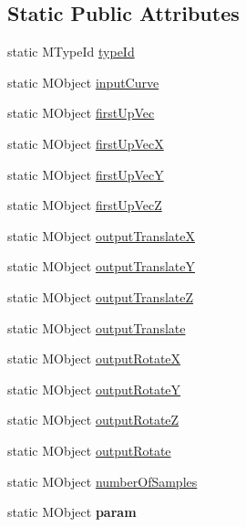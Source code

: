 \subsection*{Static Public Attributes}
\begin{DoxyCompactItemize}
\item 
static M\-Type\-Id \hyperlink{class_m_g__curve_point_abed748ebe3d1bf04847b9a2902faeff8}{type\-Id}
\item 
static M\-Object \hyperlink{class_m_g__curve_point_a466a5df04a399233b232242c869cd1ce}{input\-Curve}
\item 
static M\-Object \hyperlink{class_m_g__curve_point_a79320a0786213a2898e043f8f98cecd0}{first\-Up\-Vec}
\item 
static M\-Object \hyperlink{class_m_g__curve_point_ac612721b20d10233d1ba845ea983c679}{first\-Up\-Vec\-X}
\item 
static M\-Object \hyperlink{class_m_g__curve_point_a12473b7bc7699e71f1331123c73df9e7}{first\-Up\-Vec\-Y}
\item 
static M\-Object \hyperlink{class_m_g__curve_point_af30ebd37b5c2af1ef04940d817c010f8}{first\-Up\-Vec\-Z}
\item 
static M\-Object \hyperlink{class_m_g__curve_point_a6f51d7ea668cb3c1200c2dab41858d10}{output\-Translate\-X}
\item 
static M\-Object \hyperlink{class_m_g__curve_point_abc8256361a9df11f1e9e3df8d5c636a6}{output\-Translate\-Y}
\item 
static M\-Object \hyperlink{class_m_g__curve_point_ab4c552f7a4df2a5cf4317414756604f2}{output\-Translate\-Z}
\item 
static M\-Object \hyperlink{class_m_g__curve_point_a847125bfa0a6946db60dd2fffe6e5a37}{output\-Translate}
\item 
static M\-Object \hyperlink{class_m_g__curve_point_a0a64f7e3cdcbb2ab38b22db884eb24f3}{output\-Rotate\-X}
\item 
static M\-Object \hyperlink{class_m_g__curve_point_a9ecdff080fe7327f09900185d1adff2b}{output\-Rotate\-Y}
\item 
static M\-Object \hyperlink{class_m_g__curve_point_ac7bb1789786719174d617d85f3f78796}{output\-Rotate\-Z}
\item 
static M\-Object \hyperlink{class_m_g__curve_point_ad286406025b43364a2999b10d40a66ba}{output\-Rotate}
\item 
static M\-Object \hyperlink{class_m_g__curve_point_aca4113084e81dbafd4cb383865af23d0}{number\-Of\-Samples}
\item 
\hypertarget{class_m_g__curve_point_afd0d80392a7b92137dd3e1a4016041f6}{static M\-Object {\bfseries param}}\label{class_m_g__curve_point_afd0d80392a7b92137dd3e1a4016041f6}


\end{DoxyCompactItemize}
